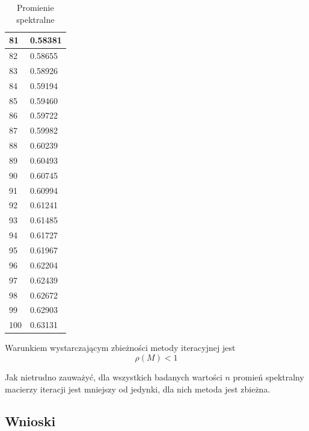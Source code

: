 \documentclass{article}
\begin{document}
\begin{table}[H]
\begin{tabular}{|l|l|}
81 & 0.58381 \\ \hline
82 & 0.58655 \\ \hline
83 & 0.58926 \\ \hline
84 & 0.59194 \\ \hline
85 & 0.59460 \\ \hline
86 & 0.59722 \\ \hline
87 & 0.59982 \\ \hline
88 & 0.60239 \\ \hline
89 & 0.60493 \\ \hline
90 & 0.60745 \\ \hline
91 & 0.60994 \\ \hline
92 & 0.61241 \\ \hline
93 & 0.61485 \\ \hline
94 & 0.61727 \\ \hline
95 & 0.61967 \\ \hline
96 & 0.62204 \\ \hline
97 & 0.62439 \\ \hline
98 & 0.62672 \\ \hline
99 & 0.62903 \\ \hline
100 & 0.63131 \\ \hline
\end{tabular}
\caption{Promienie spektralne}
\end{table}

Warunkiem wystarczającym zbieżności metody iteracyjnej jest
$$\rho(M)<1$$

Jak nietrudno zauważyć, dla wszystkich badanych wartości $n$ promień spektralny macierzy iteracji jest mniejszy
od jedynki, dla nich metoda jest zbieżna.

\subsection{Wnioski}
\end{document}
